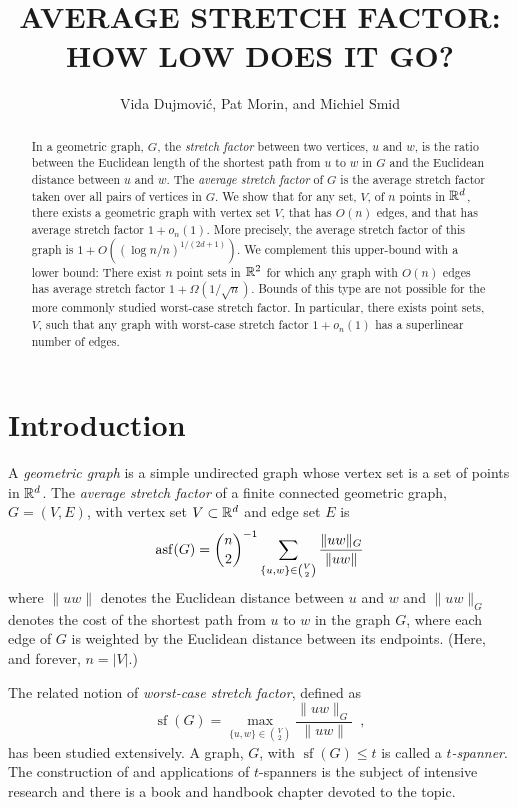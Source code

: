 \documentclass{patmorin}
\title{\MakeUppercase{Average Stretch Factor: How Low Does It Go?}}
\author{Vida Dujmovi\'c, Pat Morin, and Michiel Smid}
\DeclareMathOperator{\asf}{asf}
\DeclareMathOperator{\strf}{sf}
\begin{document}
\begin{titlepage}
\maketitle

\begin{abstract}
  In a geometric graph, $G$, the \emph{stretch factor} between two
  vertices, $u$ and $w$, is the ratio between the Euclidean length of
  the shortest path from $u$ to $w$ in $G$ and the Euclidean distance
  between $u$ and $w$.  The \emph{average stretch factor} of $G$ is
  the average stretch factor taken over all pairs of vertices in $G$.
  We show that for any set, $V$, of $n$ points in $\mathbb{R}^d$, there exists
  a geometric graph with vertex set $V$, that has $O(n)$ edges, and
  that has average stretch factor $1+ o_n(1)$.  More precisely, the
  average stretch factor of this graph is $1+O((\log n/n)^{1/(2d+1)})$.
  We complement this upper-bound with a lower bound: There exist $n$
  point sets in $\mathbb{R}^2$ for which any graph with $O(n)$ edges has average
  stretch factor $1+\Omega(1/\sqrt{n})$.  Bounds of this type are not
  possible for the more commonly studied worst-case stretch factor.
  In particular, there exists point sets, $V$, such that any graph with
  worst-case stretch factor $1+o_n(1)$ has a superlinear number of edges.
\end{abstract}

\end{titlepage}

\section{Introduction}

A \emph{geometric graph} is a simple undirected graph whose vertex set
is a set of points in $\mathbb{R}^d$.  The \emph{average stretch factor} of
a finite connected geometric graph, $G=(V,E)$, with vertex set $V\subset \mathbb{R}^d$
and edge set $E$ is
\begin{equation}
    \asf(G) = \binom{n}{2}^{-1}\sum_{\{u,w\}\in\binom{V}{2}}\frac{\|uw\|_G}{\|uw\|} \eqlabel{asf}
\end{equation}
where $\|uw\|$ denotes the Euclidean distance between $u$ and $w$
and $\|uw\|_G$ denotes the cost of the shortest path from $u$ to $w$
in the graph $G$, where each edge of $G$ is weighted by the Euclidean
distance between its endpoints.  (Here, and forever, $n=|V|$.)

The related notion of \emph{worst-case
stretch factor}, defined as
\[
    \strf(G) = \max_{\{u,w\}\in\binom{V}{2}}\frac{\|uw\|_G}{\|uw\|}  \enspace ,
\]
has been studied extensively.  A graph, $G$, with $\strf(G)\le t$ is
called a \emph{$t$-spanner}.  The construction of and applications
of $t$-spanners is the subject of intensive research and there
is a book \cite{narasimhan.smid:geometric} and handbook chapter
\cite{eppstein:spanning} devoted to the topic.
\end{document}
